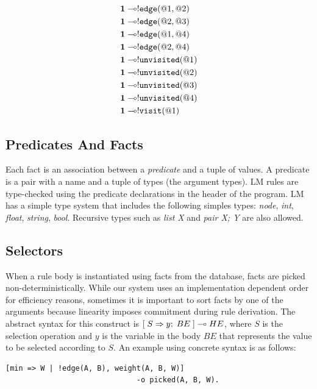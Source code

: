 \nopagebreak

\begin{align}
\mathbf{1} \multimap & {!} \mathtt{edge}(@1, @2) \\
\mathbf{1} \multimap & {!} \mathtt{edge}(@2, @3) \\
\mathbf{1} \multimap & {!} \mathtt{edge}(@1, @4) \\
\mathbf{1} \multimap & {!} \mathtt{edge}(@2, @4) \\
\mathbf{1} \multimap & {!} \mathtt{unvisited}(@1)  \\
\mathbf{1} \multimap & {!} \mathtt{unvisited}(@2) \\
\mathbf{1} \multimap & {!} \mathtt{unvisited}(@3) \\
\mathbf{1} \multimap & {!} \mathtt{unvisited}(@4) \\
\mathbf{1} \multimap & {!} \mathtt{visit}(@1)
\end{align}

\subsection{Predicates And Facts}

Each fact is an association between a \emph{predicate} and a tuple of values. A
predicate is a pair with a name and a tuple of types (the argument types). LM
rules are type-checked using the predicate declarations in the header of the
program. LM has a simple type system that includes the following simples types:
\emph{node}, \emph{int}, \emph{float}, \emph{string}, \emph{bool}. Recursive
types such as \emph{list X} and \emph{pair X; Y} are also allowed.

\subsection{Selectors}

When a rule body is instantiated using facts from the database, facts are picked
non-deterministically. While our system uses an implementation dependent order
for efficiency reasons, sometimes it is important to sort facts by one of the
arguments because linearity imposes commitment during rule derivation. The
abstract syntax for this construct is $[\; S \Rightarrow y; \; BE \;] \multimap HE$, where $S$ is
the selection operation and $y$ is the variable in the body $BE$ that represents
the value to be selected according to $S$. An example using concrete syntax is
as follows:

{\small
\begin{Verbatim}
[min => W | !edge(A, B), weight(A, B, W)]
                              -o picked(A, B, W).
\end{Verbatim}
}

